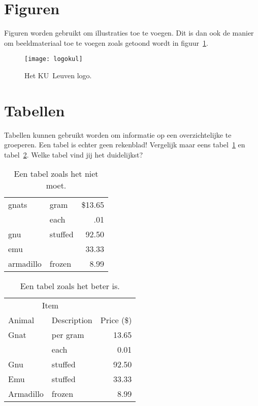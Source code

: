 \section{Figuren}
Figuren worden gebruikt om illustraties toe te voegen. Dit is dan ook de
manier om beeldmateriaal toe te voegen zoals getoond wordt in
figuur~\ref{fig:logo}.

\begin{figure}
  \centering
  \texttt{[image: logokul]}
  \caption{Het KU~Leuven logo.}
  \label{fig:logo}
\end{figure}

\section{Tabellen}
Tabellen kunnen gebruikt worden om informatie op een overzichtelijke te
groeperen. Een tabel is echter geen rekenblad! Vergelijk maar eens
tabel~\ref{tab:verkeerd} en tabel~\ref{tab:juist}. Welke tabel vind jij het
duidelijkst?

\begin{table}
  \centering
  \begin{tabular}{||l|lr||} \hline
    gnats     & gram      & \$13.65 \\ \cline{2-3}
              & each      & .01 \\ \hline
    gnu       & stuffed   & 92.50 \\ \cline{1-1} \cline{3-3}
    emu       &           & 33.33 \\ \hline
    armadillo & frozen    & 8.99 \\ \hline
  \end{tabular}
  \caption{Een tabel zoals het niet moet.}
  \label{tab:verkeerd}
\end{table}

\begin{table}
  \centering
  \begin{tabular}{@{}llr@{}} \toprule
    \multicolumn{2}{c}{Item} \\ \cmidrule(r){1-2}
    Animal    & Description & Price (\$)\\ \midrule
    Gnat      & per gram    & 13.65 \\
              & each        & 0.01 \\
    Gnu       & stuffed     & 92.50 \\
    Emu       & stuffed     & 33.33 \\
    Armadillo & frozen      & 8.99 \\ \bottomrule
  \end{tabular}
  \caption{Een tabel zoals het beter is.}
  \label{tab:juist}
\end{table}

